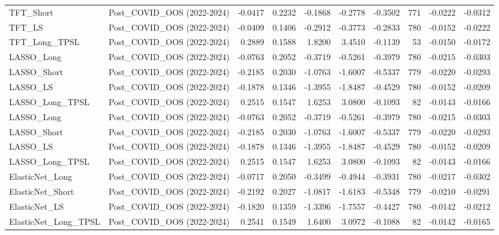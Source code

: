 \begin{tabular}{llrrrrrrrr}
\cline{1-10}
TFT\_Short & Post\_COVID\_OOS (2022-2024) & -0.0417 & 0.2232 & -0.1868 & -0.2778 & -0.3502 & 771 & -0.0222 & -0.0312 \\
\cline{1-10}
TFT\_LS & Post\_COVID\_OOS (2022-2024) & -0.0409 & 0.1406 & -0.2912 & -0.3773 & -0.2833 & 780 & -0.0152 & -0.0222 \\
\cline{1-10}
TFT\_Long\_TPSL & Post\_COVID\_OOS (2022-2024) & 0.2889 & 0.1588 & 1.8200 & 3.4510 & -0.1139 & 53 & -0.0150 & -0.0172 \\
\cline{1-10}
LASSO\_Long & Post\_COVID\_OOS (2022-2024) & -0.0763 & 0.2052 & -0.3719 & -0.5261 & -0.3979 & 780 & -0.0215 & -0.0303 \\
\cline{1-10}
LASSO\_Short & Post\_COVID\_OOS (2022-2024) & -0.2185 & 0.2030 & -1.0763 & -1.6007 & -0.5337 & 779 & -0.0220 & -0.0293 \\
\cline{1-10}
LASSO\_LS & Post\_COVID\_OOS (2022-2024) & -0.1878 & 0.1346 & -1.3955 & -1.8487 & -0.4529 & 780 & -0.0152 & -0.0209 \\
\cline{1-10}
LASSO\_Long\_TPSL & Post\_COVID\_OOS (2022-2024) & 0.2515 & 0.1547 & 1.6253 & 3.0800 & -0.1093 & 82 & -0.0143 & -0.0166 \\
\cline{1-10}
LASSO\_Long & Post\_COVID\_OOS (2022-2024) & -0.0763 & 0.2052 & -0.3719 & -0.5261 & -0.3979 & 780 & -0.0215 & -0.0303 \\
\cline{1-10}
LASSO\_Short & Post\_COVID\_OOS (2022-2024) & -0.2185 & 0.2030 & -1.0763 & -1.6007 & -0.5337 & 779 & -0.0220 & -0.0293 \\
\cline{1-10}
LASSO\_LS & Post\_COVID\_OOS (2022-2024) & -0.1878 & 0.1346 & -1.3955 & -1.8487 & -0.4529 & 780 & -0.0152 & -0.0209 \\
\cline{1-10}
LASSO\_Long\_TPSL & Post\_COVID\_OOS (2022-2024) & 0.2515 & 0.1547 & 1.6253 & 3.0800 & -0.1093 & 82 & -0.0143 & -0.0166 \\
\cline{1-10}
ElasticNet\_Long & Post\_COVID\_OOS (2022-2024) & -0.0717 & 0.2050 & -0.3499 & -0.4944 & -0.3931 & 780 & -0.0217 & -0.0302 \\
\cline{1-10}
ElasticNet\_Short & Post\_COVID\_OOS (2022-2024) & -0.2192 & 0.2027 & -1.0817 & -1.6183 & -0.5348 & 779 & -0.0210 & -0.0291 \\
\cline{1-10}
ElasticNet\_LS & Post\_COVID\_OOS (2022-2024) & -0.1820 & 0.1359 & -1.3396 & -1.7557 & -0.4427 & 780 & -0.0142 & -0.0212 \\
\cline{1-10}
ElasticNet\_Long\_TPSL & Post\_COVID\_OOS (2022-2024) & 0.2541 & 0.1549 & 1.6400 & 3.0972 & -0.1088 & 82 & -0.0142 & -0.0165 \\

\end{tabular}
